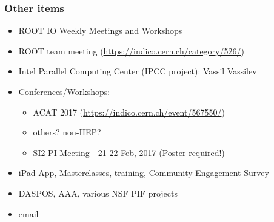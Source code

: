\begin{frame}
\frametitle{Other items}

\begin{itemize}
\item ROOT IO Weekly Meetings and Workshops
\item ROOT team meeting (\url{https://indico.cern.ch/category/526/})
\item Intel Parallel Computing Center (IPCC project): Vassil Vassilev
\item Conferences/Workshops:
  \begin{itemize}
  \item ACAT 2017 (\url{https://indico.cern.ch/event/567550/})
  \item others? non-HEP?
  \item SI2 PI Meeting - 21-22 Feb, 2017 (Poster required!)
  \end{itemize}
\item iPad App, Masterclasses, training, Community Engagement Survey
\item DASPOS, AAA, various NSF PIF projects
\item email
\end{itemize}

\end{frame}


